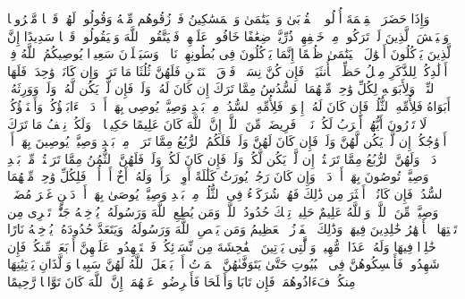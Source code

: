 \startbuffer[\q:4:8]
وَإِذَا حَضَرَ ٱلۡقِسۡمَةَ أُو۟لُوا۟ ٱلۡقُرۡبَىٰ وَٱلۡیَتَٰمَىٰ وَٱلۡمَسَٰكِینُ فَٱرۡزُقُوهُم مِّنۡهُ وَقُولُوا۟ لَهُمۡ قَوۡلࣰا مَّعۡرُوفࣰا%
\stopbuffer
\startbuffer[\q:4:9]
وَلۡیَخۡشَ ٱلَّذِینَ لَوۡ تَرَكُوا۟ مِنۡ خَلۡفِهِمۡ ذُرِّیَّةࣰ ضِعَٰفًا خَافُوا۟ عَلَیۡهِمۡ فَلۡیَتَّقُوا۟ ٱللَّهَ وَلۡیَقُولُوا۟ قَوۡلࣰا سَدِیدًا%
\stopbuffer
\startbuffer[\q:4:10]
إِنَّ ٱلَّذِینَ یَأۡكُلُونَ أَمۡوَٰلَ ٱلۡیَتَٰمَىٰ ظُلۡمًا إِنَّمَا یَأۡكُلُونَ فِی بُطُونِهِمۡ نَارࣰاۖ وَسَیَصۡلَوۡنَ سَعِیرࣰا%
\stopbuffer
\startbuffer[\q:4:11]
یُوصِیكُمُ ٱللَّهُ فِیۤ أَوۡلَٰدِكُمۡۖ لِلذَّكَرِ مِثۡلُ حَظِّ ٱلۡأُنثَیَیۡنِۚ فَإِن كُنَّ نِسَاۤءࣰ فَوۡقَ ٱثۡنَتَیۡنِ فَلَهُنَّ ثُلُثَا مَا تَرَكَۖ وَإِن كَانَتۡ وَٰحِدَةࣰ فَلَهَا ٱلنِّصۡفُۚ وَلِأَبَوَیۡهِ لِكُلِّ وَٰحِدࣲ مِّنۡهُمَا ٱلسُّدُسُ مِمَّا تَرَكَ إِن كَانَ لَهُۥ وَلَدࣱۚ فَإِن لَّمۡ یَكُن لَّهُۥ وَلَدࣱ وَوَرِثَهُۥۤ أَبَوَاهُ فَلِأُمِّهِ ٱلثُّلُثُۚ فَإِن كَانَ لَهُۥۤ إِخۡوَةࣱ فَلِأُمِّهِ ٱلسُّدُسُۚ مِنۢ بَعۡدِ وَصِیَّةࣲ یُوصِی بِهَاۤ أَوۡ دَیۡنٍۗ ءَابَاۤؤُكُمۡ وَأَبۡنَاۤؤُكُمۡ لَا تَدۡرُونَ أَیُّهُمۡ أَقۡرَبُ لَكُمۡ نَفۡعࣰاۚ فَرِیضَةࣰ مِّنَ ٱللَّهِۗ إِنَّ ٱللَّهَ كَانَ عَلِیمًا حَكِیمࣰا%
\stopbuffer
\startbuffer[\q:4:12]
۞ وَلَكُمۡ نِصۡفُ مَا تَرَكَ أَزۡوَٰجُكُمۡ إِن لَّمۡ یَكُن لَّهُنَّ وَلَدࣱۚ فَإِن كَانَ لَهُنَّ وَلَدࣱ فَلَكُمُ ٱلرُّبُعُ مِمَّا تَرَكۡنَۚ مِنۢ بَعۡدِ وَصِیَّةࣲ یُوصِینَ بِهَاۤ أَوۡ دَیۡنࣲۚ وَلَهُنَّ ٱلرُّبُعُ مِمَّا تَرَكۡتُمۡ إِن لَّمۡ یَكُن لَّكُمۡ وَلَدࣱۚ فَإِن كَانَ لَكُمۡ وَلَدࣱ فَلَهُنَّ ٱلثُّمُنُ مِمَّا تَرَكۡتُمۚ مِّنۢ بَعۡدِ وَصِیَّةࣲ تُوصُونَ بِهَاۤ أَوۡ دَیۡنࣲۗ وَإِن كَانَ رَجُلࣱ یُورَثُ كَلَٰلَةً أَوِ ٱمۡرَأَةࣱ وَلَهُۥۤ أَخٌ أَوۡ أُخۡتࣱ فَلِكُلِّ وَٰحِدࣲ مِّنۡهُمَا ٱلسُّدُسُۚ فَإِن كَانُوۤا۟ أَكۡثَرَ مِن ذَٰلِكَ فَهُمۡ شُرَكَاۤءُ فِی ٱلثُّلُثِۚ مِنۢ بَعۡدِ وَصِیَّةࣲ یُوصَىٰ بِهَاۤ أَوۡ دَیۡنٍ غَیۡرَ مُضَاۤرࣲّۚ وَصِیَّةࣰ مِّنَ ٱللَّهِۗ وَٱللَّهُ عَلِیمٌ حَلِیمࣱ%
\stopbuffer
\startbuffer[\q:4:13]
تِلۡكَ حُدُودُ ٱللَّهِۚ وَمَن یُطِعِ ٱللَّهَ وَرَسُولَهُۥ یُدۡخِلۡهُ جَنَّٰتࣲ تَجۡرِی مِن تَحۡتِهَا ٱلۡأَنۡهَٰرُ خَٰلِدِینَ فِیهَاۚ وَذَٰلِكَ ٱلۡفَوۡزُ ٱلۡعَظِیمُ%
\stopbuffer
\startbuffer[\q:4:14]
وَمَن یَعۡصِ ٱللَّهَ وَرَسُولَهُۥ وَیَتَعَدَّ حُدُودَهُۥ یُدۡخِلۡهُ نَارًا خَٰلِدࣰا فِیهَا وَلَهُۥ عَذَابࣱ مُّهِینࣱ%
\stopbuffer
\startbuffer[\q:4:15]
وَٱلَّٰتِی یَأۡتِینَ ٱلۡفَٰحِشَةَ مِن نِّسَاۤئِكُمۡ فَٱسۡتَشۡهِدُوا۟ عَلَیۡهِنَّ أَرۡبَعَةࣰ مِّنكُمۡۖ فَإِن شَهِدُوا۟ فَأَمۡسِكُوهُنَّ فِی ٱلۡبُیُوتِ حَتَّىٰ یَتَوَفَّىٰهُنَّ ٱلۡمَوۡتُ أَوۡ یَجۡعَلَ ٱللَّهُ لَهُنَّ سَبِیلࣰا%
\stopbuffer
\startbuffer[\q:4:16]
وَٱلَّذَانِ یَأۡتِیَٰنِهَا مِنكُمۡ فَءَاذُوهُمَاۖ فَإِن تَابَا وَأَصۡلَحَا فَأَعۡرِضُوا۟ عَنۡهُمَاۤۗ إِنَّ ٱللَّهَ كَانَ تَوَّابࣰا رَّحِیمًا%
